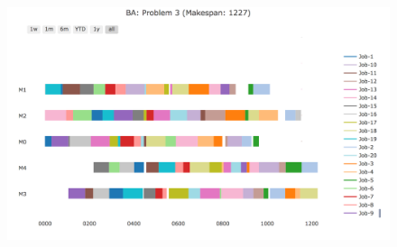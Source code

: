 \documentclass{article}
\begin{document}
\begin{figure}[h]
  \centering
  \includegraphics[scale=.45]{../Results/PNG/ba_3.png}
\end{figure}
\end{document}
